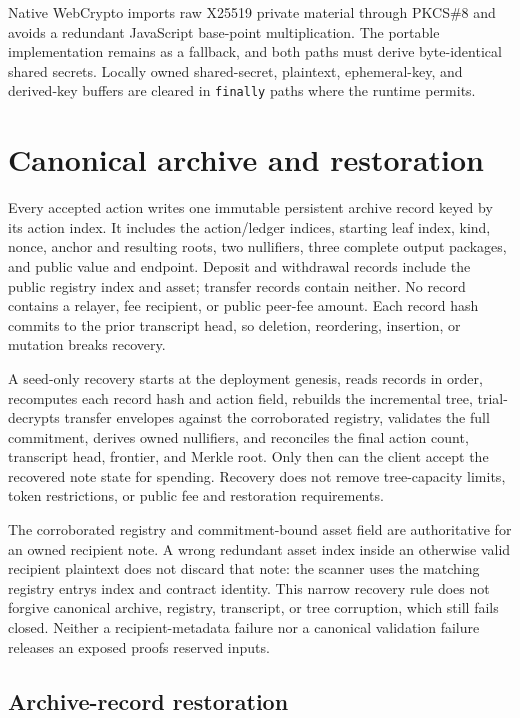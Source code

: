 \documentclass[11pt,letterpaper]{article}
\begin{document}
Native WebCrypto imports raw X25519 private material through PKCS\#8 and
avoids a redundant JavaScript base-point multiplication. The portable
implementation remains as a fallback, and both paths must derive
byte-identical shared secrets. Locally owned shared-secret, plaintext,
ephemeral-key, and derived-key buffers are cleared in \texttt{finally}
paths where the runtime permits.

\section{Canonical archive and
restoration}\label{canonical-archive-and-restoration}

Every accepted action writes one immutable persistent archive record
keyed by its action index. It includes the action/\allowbreak{}ledger
indices, starting leaf index, kind, nonce, anchor and resulting roots,
two nullifiers, three complete output packages, and public value and
endpoint. Deposit and withdrawal records include the public registry
index and asset; transfer records contain neither. No record contains a
relayer, fee recipient, or public peer-fee amount. Each record hash
commits to the prior transcript head, so deletion, reordering,
insertion, or mutation breaks recovery.

A seed-only recovery starts at the deployment genesis, reads records in
order, recomputes each record hash and action field, rebuilds the
incremental tree, trial-decrypts transfer envelopes against the
corroborated registry, validates the full commitment, derives owned
nullifiers, and reconciles the final action count, transcript head,
frontier, and Merkle root. Only then can the client accept the recovered
note state for spending. Recovery does not remove tree-capacity limits,
token restrictions, or public fee and restoration requirements.

The corroborated registry and commitment-bound asset field are
authoritative for an owned recipient note. A wrong redundant asset index
inside an otherwise valid recipient plaintext does not discard that
note: the scanner uses the matching registry entry\textquotesingle s
index and contract identity. This narrow recovery rule does not forgive
canonical archive, registry, transcript, or tree corruption, which still
fails closed. Neither a recipient-metadata failure nor a canonical
validation failure releases an exposed proof\textquotesingle s reserved
inputs.

\subsection{Archive-record
restoration}\label{archive-record-restoration}
\end{document}
